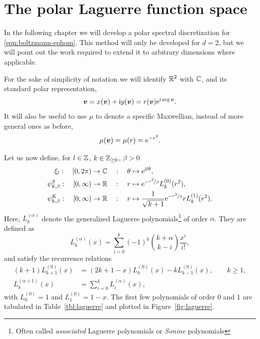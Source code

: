 \section{The polar Laguerre function space} \label{sec:polar}

In the following chapter we will develop a polar spectral discretization for \eqref{eqn:boltzmann-sphom}. This
method will only be developed for $d=2$, but we will point out the work required to extend it to arbitrary
dimensions where applicable.

For the sake of simplicity of notation we will identify $\mathbb{R}^2$ with $\mathbb{C}$, and its standard polar
representation,
\[
    {\bm v} = x({\bm v}) + \mathrm{i} y({\bm v}) = r({\bm v}) \mathrm{e}^{\mathrm{i}\arg{\bm v}}.
\]
It will also be useful to use $\mu$ to denote a specific Maxwellian, instead of more general ones as before,
\begin{equation} \label{eqn:norm-max}
    \mu({\bm v}) = \mu(r) = \mathrm{e}^{-r^2}.
\end{equation}

Let us now define, for $l\in\mathbb{Z}$, $k\in\mathbb{Z}_{\geq0}$, $\beta>0$
\begin{align}
    \xi_l : \quad [0,2\pi) \to \mathbb{C} \quad &: \quad \theta \mapsto \mathrm{e}^{\mathrm{i} l \theta}, \label{eqn:def-ce} \\
    \psi_{k,\beta}^{\mathrm{S}} : \quad [0,\infty) \to \mathbb{R} \quad &:
        \quad r \mapsto \mathrm{e}^{-\nicefrac{r^2}{\beta}} L_k^{(0)}(r^2),
    \label{eqn:def-psis} \\
    \psi_{k,\beta}^{\mathrm{K}} : \quad [0,\infty) \to \mathbb{R} \quad &: \quad r \mapsto \frac{1}{\sqrt{k+1}}
                                                 \mathrm{e}^{-\nicefrac{r^2}{\beta}} r L_k^{(1)}(r^2).
    \label{eqn:def-psik}
\end{align}
Here, $L_k^{(\alpha)}$ denote the generalized Laguerre polynomials\footnote{Often called {\em associated}
Laguerre polynomials or {\em Sonine} polynomials} of order $\alpha$. They are defined as
\begin{equation} \label{eqn:def-lag}
    L_k^{(\alpha)}(x) = \sum_{i=0}^k (-1)^k \binom{k+\alpha}{k-i} \frac{x^i}{i!},
\end{equation}
and satisfy the recurrence relations
\begin{align}
    \label{eqn:lag0-rec} (k+1)L^{(0)}_{k+1}(x) &= (2k+1-x)L_k^{(0)}(x) - kL_{k-1}^{(0)}(x), \qquad k \geq 1, \\
    \label{eqn:lag1-rec} L_k^{(\alpha+1)}(x) &= \sum_{i=0}^k L_i^{(\alpha)}(x),
\end{align}
with $L_0^{(0)} = 1$ and $L_1^{(0)} = 1-x$. The first few polynomials of order $0$ and $1$ are tabulated in
Table~\ref{tbl:laguerre} and plotted in Figure~\ref{fig:laguerre}.

